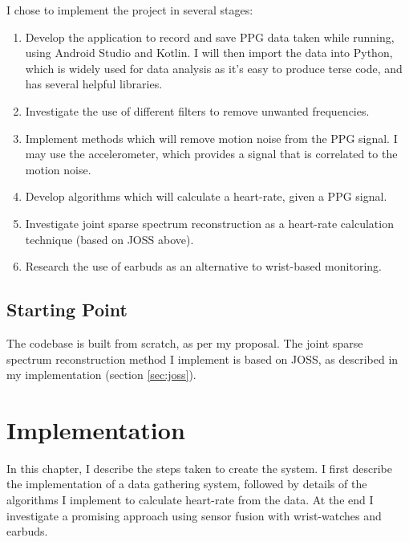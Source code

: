 \documentclass[12pt,a4paper,twoside,openany]{report}
\begin{document}
I chose to implement the project in several stages:

\begin{enumerate}
	\item Develop the application to record and save PPG data taken while
		running, using Android Studio and Kotlin. I will then import the data
		into Python, which is widely used for data analysis as it's
		easy to produce terse code, and has several helpful
		libraries.

	\item Investigate the use of different filters to remove unwanted frequencies.

	\item Implement methods which will remove motion noise from the PPG
		signal. I may use the accelerometer, which provides a signal
		that is correlated to
		the motion noise.

	\item Develop algorithms which will calculate a heart-rate, given a
		PPG signal.

	\item Investigate joint sparse spectrum reconstruction as a heart-rate
		calculation technique (based on JOSS above).

	\item Research the use of earbuds as an alternative to wrist-based
		monitoring.

\end{enumerate}




\section{Starting Point}

The codebase is built from scratch, as per my proposal. The joint sparse
spectrum reconstruction method I implement is based on JOSS, as described in
my implementation (section \ref{sec:joss}).

\chapter{Implementation}

In this chapter, I describe the steps taken to create the system. I first
describe the implementation of a data gathering system, followed by details of
the algorithms I implement to calculate heart-rate from the data. At the end
I investigate a promising approach using sensor fusion with 
wrist-watches and earbuds.
\end{document}
